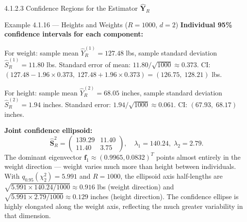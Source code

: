 \documentclass[aspectratio=169,10pt]{beamer}
\begin{document}
\begin{frame}[allowframebreaks]{4.1.2.3 Confidence Regions for the Estimator $\hat{\mathbf{Y}}_R$}
\begin{exampleblock}{Example 4.1.16 --- Heights and Weights ($R=1000$, $d=2$)}
  \textbf{Individual 95\% confidence intervals for each component:}

  For weight: sample mean $\hat{Y}_R^{(1)} = 127.48$ lbs,
  sample standard deviation $\hat{S}_R^{(1)} = 11.80$ lbs.
  Standard error of mean: $11.80/\sqrt{1000} \approx 0.373$.
  CI: $(127.48 - 1.96 \times 0.373,\; 127.48 + 1.96 \times 0.373) = (126.75,\; 128.21)$ lbs.

  For height: sample mean $\hat{Y}_R^{(2)} = 68.05$ inches,
  sample standard deviation $\hat{S}_R^{(2)} = 1.94$ inches.
  Standard error: $1.94/\sqrt{1000} \approx 0.061$.
  CI: $(67.93,\; 68.17)$ inches.

  \textbf{Joint confidence ellipsoid:}
  \[
    \hat{\mathbf{S}}_R^2 = \begin{pmatrix} 139.29 & 11.40 \\ 11.40 & 3.75 \end{pmatrix},
    \quad \lambda_1 = 140.24,\;\lambda_2 = 2.79.
  \]
  The dominant eigenvector $\mathbf{f}_1 \approx (0.9965, 0.0832)^T$
  points almost entirely in the weight direction --- weight varies much
  more than height between individuals.  With $q_{0.95}(\chi_2^2) = 5.991$
  and $R = 1000$, the ellipsoid axis half-lengths are
  $\sqrt{5.991 \times 140.24 / 1000} \approx 0.916$ lbs (weight direction)
  and $\sqrt{5.991 \times 2.79 / 1000} \approx 0.129$ inches (height direction).
  The confidence ellipse is highly elongated along the weight axis,
  reflecting the much greater variability in that dimension.
\end{exampleblock}

\end{frame}
\end{document}
